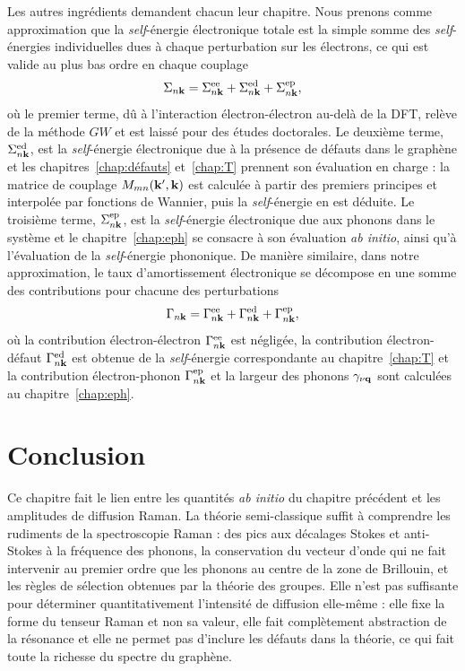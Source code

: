 Les autres ingrédients demandent chacun leur chapitre. Nous prenons comme approximation que la \textit{self}-énergie électronique totale est la simple somme des \textit{self}-énergies individuelles dues à chaque perturbation sur les électrons, ce qui est valide au plus bas ordre en chaque couplage
\begin{equation}
    \Sigma_{n\mathbf{k}} = \Sigma_{n\mathbf{k}}^\text{ee}+\Sigma_{n\mathbf{k}}^\text{ed}+\Sigma_{n\mathbf{k}}^\text{ep},
\end{equation}
où le premier terme, dû à l'interaction électron-électron au-delà de la DFT, relève de la méthode $GW$ et est laissé pour des études doctorales. Le deuxième terme, $\Sigma_{n\mathbf{k}}^\text{ed}$, est la \textit{self}-énergie électronique due à la présence de défauts dans le graphène et les chapitres~\ref{chap:défauts} et~\ref{chap:T} prennent son évaluation en charge : la matrice de couplage $M_{mn}(\mathbf{k}',\mathbf{k})$ est calculée à partir des premiers principes et interpolée par fonctions de Wannier, puis la \textit{self}-énergie en est déduite. Le troisième terme, $\Sigma_{n\mathbf{k}}^\text{ep}$, est la \textit{self}-énergie électronique due aux phonons dans le système et le chapitre~\ref{chap:eph} se consacre à son évaluation \textit{ab initio}, ainsi qu'à l'évaluation de la \textit{self}-énergie phononique. De manière similaire, dans notre approximation, le taux d'amortissement électronique se décompose en une somme des contributions pour chacune des perturbations
\begin{equation}
    \Gamma_{n\mathbf{k}} =  \Gamma_{n\mathbf{k}}^\text{ee}+ \Gamma_{n\mathbf{k}}^\text{ed}+ \Gamma_{n\mathbf{k}}^\text{ep},
\end{equation}
où la contribution électron-électron $\Gamma_{n\mathbf{k}}^\text{ee}$ est négligée, la contribution électron-défaut $\Gamma_{n\mathbf{k}}^\text{ed}$ est obtenue de la \textit{self}-énergie correspondante au chapitre~\ref{chap:T} et la contribution électron-phonon $ \Gamma_{n\mathbf{k}}^\text{ep}$ et la largeur des phonons $\gamma_{\nu\mathbf{q}}$ sont calculées au chapitre~\ref{chap:eph}.

\section{Conclusion}

Ce chapitre fait le lien entre les quantités \textit{ab initio} du chapitre précédent et les amplitudes de diffusion Raman. La théorie semi-classique suffit à comprendre les rudiments de la spectroscopie Raman : des pics aux décalages Stokes et anti-Stokes à la fréquence des phonons, la conservation du vecteur d'onde qui ne fait intervenir au premier ordre que les phonons au centre de la zone de Brillouin, et les règles de sélection obtenues par la théorie des groupes. Elle n'est pas suffisante pour déterminer quantitativement l'intensité de diffusion elle-même : elle fixe la forme du tenseur Raman et non sa valeur, elle fait complètement abstraction de la résonance et elle ne permet pas d'inclure les défauts dans la théorie, ce qui fait toute la richesse du spectre du graphène.

